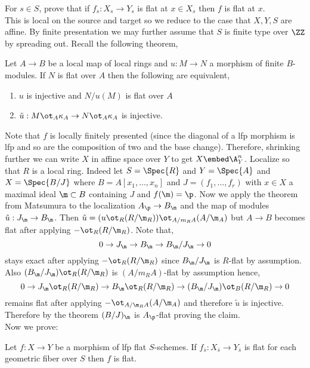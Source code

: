\documentclass[12pt]{article}
\begin{document}
For $s \in S$, prove that if $f_s : X_s \to Y_s$ is flat at $x \in X_s$ then $f$ is flat at $x$.
\bigskip\\
This is local on the source and target so we reduce to the case that $X,Y,S$ are affine. By finite presentation we may further assume that $S$ is finite type over $\ZZ$ by spreading out. Recall the following theorem,

\begin{theorem}
Let $A \to B$ be a local map of local rings and $u : M \to N$ a morphism of finite $B$-modules. If $N$ is flat over $A$ then the following are equivalent,
\begin{enumerate}
\item $u$ is injective and $N/u(M)$ is flat over $A$
\item $\tilde{u} : M \ot_A \kappa_A \to N \ot_A \kappa_A$ is injective.
\end{enumerate}
\end{theorem}

Note that $f$ is locally finitely presented (since the diagonal of a lfp morphism is lfp and so are the composition of two and the base change). Therefore, shrinking further we can write $X$ in affine space over $Y$ to get $X \embed \A^n_Y$. Localize so that $R$ is a local ring. Indeed let $S = \Spec{R}$ and $Y = \Spec{A}$ and $X = \Spec{B/J}$ where $B = A[x_1, \dots, x_n]$ and $J = (f_1, \dots, f_r)$ with $x \in X$ a maximal ideal $\m \subset B$ containing $J$ and $f(\m) = \p$. Now we apply the theorem from Matsumura to the localization $A_{\p} \to B_{\m}$ and the map of modules $\tilde{u} : J_\m \to B_\m$. Then $\tilde{u} = (u \ot_R (R / \m_R)) \ot_{A/m_R A} (A / \m_A)$ but $A \to B$ becomes flat after applying $- \ot_R (R / \m_R)$. Note that,
\[ 0 \to J_\m \to B_\m \to B_\m/J_\m \to 0 \]
stays exact after applying $- \ot_R (R / \m_R)$ since $B_\m/J_\m$ is $R$-flat by assumption. Also $(B_\m / J_\m) \ot_R (R / \m_R)$ is $(A/m_R A)$-flat by assumption hence,
\[ 0 \to J_\m \ot_{R} (R / \m_R) \to B_\m \ot_{R} (R / \m_R) \to (B_\m / J_\m) \ot_B (R / \m_R) \to 0 \]
remains flat after applying $- \ot_{A / \m_R A} (A / \m_A)$ and therefore $\tilde{u}$ is injective. Therefore by the theorem $(B / J)_\m$ is $A_\p$-flat proving the claim.
\bigskip\\
Now we prove:

\begin{prop}
Let $f : X \to Y$ be a morphism of lfp flat $S$-schemes. If $f_{\bar{s}} : X_{\bar{s}} \to Y_{\bar{s}}$ is flat for each geometric fiber over $S$ then $f$ is flat.
\end{prop}
\end{document}
